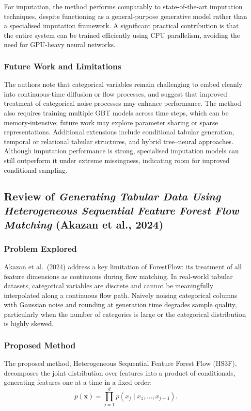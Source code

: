 For imputation, the method performs comparably to state-of-the-art imputation techniques, despite functioning as a general-purpose generative model rather than a specialised imputation framework. A significant practical contribution is that the entire system can be trained efficiently using CPU parallelism, avoiding the need for GPU-heavy neural networks.

\subsubsection{Future Work and Limitations}
The authors note that categorical variables remain challenging to embed cleanly into continuous-time diffusion or flow processes, and suggest that improved treatment of categorical noise processes may enhance performance. The method also requires training multiple GBT models across time steps, which can be memory-intensive; future work may explore parameter sharing or sparse representations. Additional extensions include conditional tabular generation, temporal or relational tabular structures, and hybrid tree--neural approaches. Although imputation performance is strong, specialised imputation models can still outperform it under extreme missingness, indicating room for improved conditional sampling.

\subsection{Review of \textit{Generating Tabular Data Using Heterogeneous Sequential Feature Forest Flow Matching} (Akazan et al., 2024)}

\subsubsection{Problem Explored}
Akazan et al.\ (2024) address a key limitation of ForestFlow: its treatment of all feature dimensions as continuous during flow matching. In real-world tabular datasets, categorical variables are discrete and cannot be meaningfully interpolated along a continuous flow path. Naively noising categorical columns with Gaussian noise and rounding at generation time degrades sample quality, particularly when the number of categories is large or the categorical distribution is highly skewed.

\subsubsection{Proposed Method}
The proposed method, Heterogeneous Sequential Feature Forest Flow (HS3F), decomposes the joint distribution over features into a product of conditionals, generating features one at a time in a fixed order:
\begin{equation}
p(\mathbf{x}) = \prod_{j=1}^{d} p(x_j \mid x_1, \ldots, x_{j-1}).
\end{equation}

